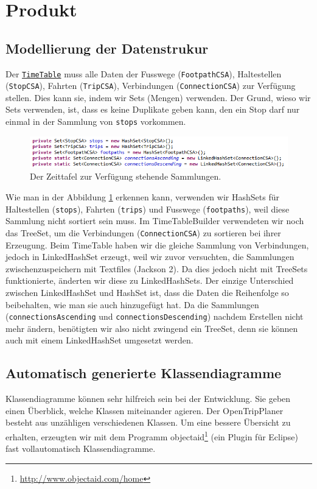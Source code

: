 \section{Produkt}



\subsection{Modellierung der Datenstrukur}
Der \hyperlink{timeTable}{\texttt{TimeTable}} muss alle Daten der Fusswege (\texttt{FootpathCSA}), Haltestellen (\texttt{StopCSA}), Fahrten (\texttt{TripCSA}), Verbindungen (\texttt{ConnectionCSA}) zur Verfügung stellen. Dies kann sie, indem wir Sets (Mengen) verwenden. Der Grund, wieso wir Sets verwenden, ist, dass es keine Duplikate geben kann, den ein Stop darf nur einmal in der Sammlung von \texttt{stops} vorkommen.
\begin{figure}[h]
	\centering
	\includegraphics[width=12cm]{img/Sammlungen.png}
	\caption{Der Zeittafel zur Verfügung stehende Sammlungen.}
	\label{fig:Sammlungen}
\end{figure}
\newline
Wie man in der Abbildung \ref{fig:Sammlungen} erkennen kann, verwenden wir HashSets für Haltestellen (\texttt{stops}), Fahrten (\texttt{trips}) und Fusswege (\texttt{footpaths}), weil diese Sammlung nicht sortiert sein muss. Im TimeTableBuilder verwendeten wir noch das TreeSet, um die Verbindungen (\texttt{ConnectionCSA}) zu sortieren bei ihrer Erzeugung. Beim TimeTable haben wir die gleiche Sammlung von Verbindungen, jedoch in LinkedHashSet erzeugt, weil wir zuvor versuchten, die Sammlungen zwischenzuspeichern mit Textfiles (Jackson 2). Da dies jedoch nicht mit TreeSets funktionierte, änderten wir diese zu LinkedHashSets. Der einzige Unterschied zwischen LinkedHashSet und HashSet ist, dass die Daten die Reihenfolge so beibehalten, wie man sie auch hinzugefügt hat. Da die Sammlungen (\texttt{connectionsAscending} und \texttt{connectionsDescending}) nachdem Erstellen nicht mehr ändern, benötigten wir also nicht zwingend ein TreeSet, denn sie können auch mit einem LinkedHashSet umgesetzt werden.


\subsection{Automatisch generierte Klassendiagramme}
Klassendiagramme können sehr hilfreich sein bei der Entwicklung. Sie geben einen Überblick, welche Klassen miteinander agieren.
Der OpenTripPlaner besteht aus unzähligen verschiedenen Klassen. Um eine bessere Übersicht zu erhalten, erzeugten wir mit dem Programm objectaid\footnote{\url{http://www.objectaid.com/home}} (ein Plugin für Eclipse) fast vollautomatisch Klassendiagramme. \newline

